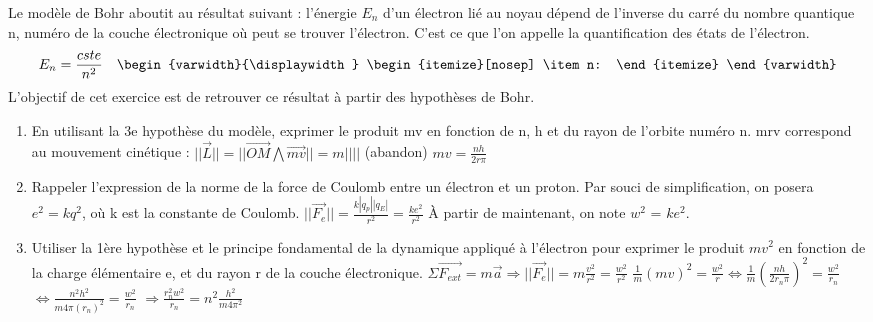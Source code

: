 \documentclass{article}
\begin{document}
Le modèle de Bohr aboutit au résultat suivant : l’énergie $E_{n}$ d’un électron lié au noyau dépend de l’inverse du carré du nombre quantique n, numéro de la couche électronique où peut se trouver l’électron. C’est ce que l’on appelle la quantification des états de l’électron.
\[
    E_{n} = \frac{cste}{n^{2}}
    \quad
    \begin{varwidth}{\displaywidth}
        \begin{itemize}[nosep]
            \item n:
        \end{itemize}
    \end{varwidth}
\]
L’objectif de cet exercice est de retrouver ce résultat à partir des hypothèses de Bohr.
\begin{enumerate}
    \item En utilisant la 3e hypothèse du modèle, exprimer le produit mv en fonction de n, h et du rayon de l’orbite numéro n.\newline
    mrv correspond au mouvement cinétique : $||\overrightarrow{L}|| = ||\overrightarrow{OM}\bigwedge\overrightarrow{mv}|| = m|||| $ (abandon)\newline
    $mv = \frac{nh}{2r\pi}$
    \item Rappeler l’expression de la norme de la force de Coulomb entre un électron et un proton.
    Par souci de simplification, on posera $e^{2}=kq^{2}$, où k est la constante de Coulomb.\newline
    $||\overrightarrow{F_{e}}|| = \frac{k|q_{p}||q_{E}|}{r^{2}} = \frac{ke^{2}}{r^{2}}$\newline
    À partir de maintenant, on note $w^{2}$ = $ke^{2}$.\newline
    \item Utiliser la 1ère hypothèse et le principe fondamental de la dynamique appliqué à l’électron pour exprimer le produit $mv^{2}$ en fonction de la charge élémentaire e, et du rayon r de la couche électronique.\newline
    $\Sigma \overrightarrow{F_{ext}} = m\overrightarrow{a} \Longrightarrow ||\overrightarrow{F_{e}}|| = m\frac{v^{2}}{r^{2}} = \frac{w^{2}}{r^{2}}$\newline
    $\frac{1}{m}(mv)^{2} = \frac{w^{2}}{r} \Longleftrightarrow \frac{1}{m}(\frac{nh}{2r_{n}\pi})^{2} = \frac{w^{2}}{r_{n}}$\newline
    $\Longleftrightarrow \frac{n^{2}h^{2}}{m4\pi (r_{n})^{2}} = \frac{w^{2}}{r_{n}}$\newline
    $\Longrightarrow \frac{r_{n}^{2}w^{2}}{r_{n}} = n^{2}\frac{h^{2}}{m4\pi^{2}}$\newline

\end{enumerate}
\end{document}
